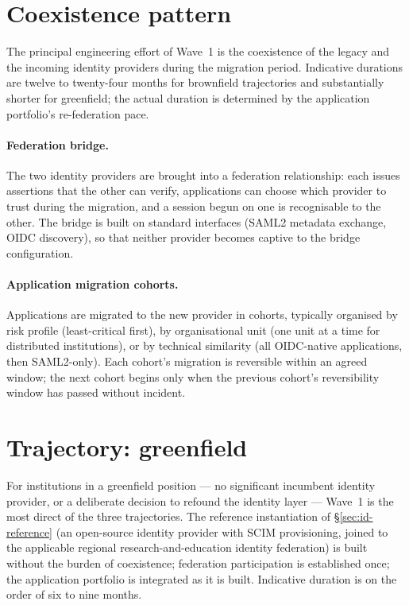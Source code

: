 \section{Coexistence pattern}
\label{sec:w1-coexistence}

The principal engineering effort of Wave~1 is the coexistence of
the legacy and the incoming identity providers during the migration
period. Indicative durations are twelve to twenty-four months for
brownfield trajectories and substantially shorter for greenfield;
the actual duration is determined by the application portfolio's
re-federation pace.

\paragraph{Federation bridge.} The two identity providers are
brought into a federation relationship: each issues assertions
that the other can verify, applications can choose which provider
to trust during the migration, and a session begun on one is
recognisable to the other. The bridge is built on standard
interfaces (SAML2 metadata exchange, OIDC discovery), so that
neither provider becomes captive to the bridge configuration.

\paragraph{Application migration cohorts.} Applications are
migrated to the new provider in cohorts, typically organised by
risk profile (least-critical first), by organisational unit (one
unit at a
time for distributed institutions), or by technical similarity
(all OIDC-native applications, then SAML2-only). Each cohort's
migration is reversible within an agreed window; the next cohort
begins only when the previous cohort's reversibility window has
passed without incident.

\section{Trajectory: greenfield}
\label{sec:w1-greenfield}

For institutions in a greenfield position --- no significant
incumbent identity provider, or a deliberate decision to refound
the identity layer ---  Wave~1 is the most direct of the three
trajectories. The reference instantiation of
\S\ref{sec:id-reference} (an open-source identity provider with
SCIM provisioning, joined to the applicable regional
research-and-education identity federation) is built
without the burden of coexistence; federation participation is
established once; the application portfolio is integrated as it
is built. Indicative duration is on the order of six to nine
months.

